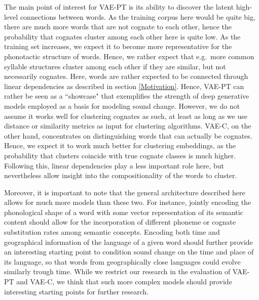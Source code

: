 \documentclass[6pt]{article}
\begin{document}
The main point of interest for VAE-PT is its ability to discover the latent high-level connections between words. As the training corpus here would be quite big, there are much more words that are not cognate to each other, hence the probability that cognates cluster among each other here is quite low. As the training set increases, we expect it to become more representative for the phonotactic structure of words. Hence, we rather expect that e.g.\ more common syllable structures cluster among each other if they are similar, but not necessarily cognates. Here, words are rather expected to be connected through linear dependencies as described in section \ref{Motivation}. Hence, VAE-PT can rather be seen as a ``showcase" that exemplifies the strength of deep generative models employed as a basis for modeling sound change. However, we do not assume it works well for clustering cognates as such, at least as long as we use distance or similarity metrics as input for clustering algorithms.
VAE-C, on the other hand, concentrates on distinguishing words that can actually be cognates. Hence, we expect it to work much better for clustering embeddings, as the probability that clusters coincide with true cognate classes is much higher. Following this, linear dependencies play a less important role here, but nevertheless allow insight into the compositionality of the words to cluster.

Moreover, it is important to note that the general architecture described here allows for much more models than these two. For instance, jointly encoding the phonological shape of a word with some vector representation of its semantic content should allow for the incorporation of different phoneme or cognate substitution rates among semantic concepts.  Encoding both time and geographical information of the language of a given word should further provide an interesting starting point to condition sound change on the time and place of its language, so that words from geographically close languages could evolve similarly trough time. While we restrict our research in the evaluation of VAE-PT and VAE-C, we think that such more complex models should provide interesting starting points for further research.
\end{document}

